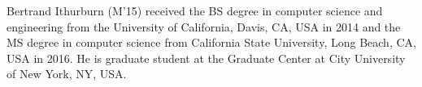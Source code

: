 \documentclass[final,journal,10pt,letterpaper,oneside,twocolumn,compsoc]%
{IEEEtran}
\begin{document}


%
%
%




% 

\begin{IEEEbiography}{Bertrand Ithurburn}
(M'15) received the BS degree in computer science and engineering from the
University of California, Davis, CA, USA in 2014 and the MS degree in computer
science from California State University, Long Beach, CA, USA in 2016. He is
graduate student at the Graduate Center at City University of New York, NY, USA.
\end{IEEEbiography}
\end{document}
